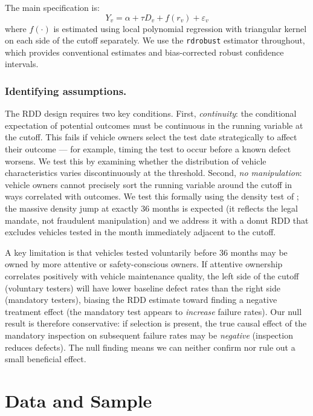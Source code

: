 \documentclass[12pt]{article}
\begin{document}
The main specification is:
\begin{equation}
Y_v = \alpha + \tau D_v + f(r_v) + \varepsilon_v
\label{eq:rdd}
\end{equation}
where $f(\cdot)$ is estimated using local polynomial regression with triangular kernel on each side of the cutoff separately. We use the \texttt{rdrobust} estimator \citep{Calonico2014} throughout, which provides conventional estimates and bias-corrected robust confidence intervals.

\subsubsection*{Identifying assumptions.}
The RDD design requires two key conditions. First, \emph{continuity}: the conditional expectation of potential outcomes must be continuous in the running variable at the cutoff. This fails if vehicle owners select the test date strategically to affect their outcome --- for example, timing the test to occur before a known defect worsens. We test this by examining whether the distribution of vehicle characteristics varies discontinuously at the threshold. Second, \emph{no manipulation}: vehicle owners cannot precisely sort the running variable around the cutoff in ways correlated with outcomes. We test this formally using the density test of \citet{McCrary2008}; the massive density jump at exactly 36 months is expected (it reflects the legal mandate, not fraudulent manipulation) and we address it with a donut RDD that excludes vehicles tested in the month immediately adjacent to the cutoff.

A key limitation is that vehicles tested voluntarily before 36 months may be owned by more attentive or safety-conscious owners. If attentive ownership correlates positively with vehicle maintenance quality, the left side of the cutoff (voluntary testers) will have lower baseline defect rates than the right side (mandatory testers), biasing the RDD estimate toward finding a negative treatment effect (the mandatory test appears to \emph{increase} failure rates). Our null result is therefore conservative: if selection is present, the true causal effect of the mandatory inspection on subsequent failure rates may be \emph{negative} (inspection reduces defects). The null finding means we can neither confirm nor rule out a small beneficial effect.

\section{Data and Sample}
\end{document}
